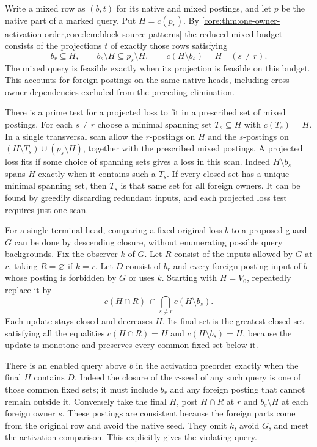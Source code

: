 Write a mixed row as $(b,t)$ for its native and mixed
postings, and let $p$ be the native part of a marked query.
Put $H=c(p_r)$. By
\cref{core:thm:one-owner-activation-order,core:lem:block-source-patterns}
the reduced mixed budget consists of the projections $t$
of exactly those rows satisfying
\[
 b_r\subseteq H,\qquad
 b_s\setminus H\subseteq p_s\setminus H,\qquad
 c(H\setminus b_s)=H \quad(s\ne r).
\]
The mixed query is feasible exactly when its projection
is feasible on this budget. This accounts for foreign
postings on the same native heads, including cross-owner
dependencies excluded from the preceding elimination.

There is a prime test for a projected loss to fit in a
prescribed set of mixed postings. For each $s\ne r$ choose
a minimal spanning set $T_s\subseteq H$ with $c(T_s)=H$.
In a single transversal scan allow the $r$-postings on
$H$ and the $s$-postings on
$(H\setminus T_s)\cup(p_s\setminus H)$, together with the
prescribed mixed postings. A projected loss fits if some
choice of spanning sets gives a loss in this scan. Indeed
$H\setminus b_s$ spans $H$ exactly when it contains such
a $T_s$. If every closed set has a unique minimal spanning
set, then $T_s$ is that same set for all foreign owners.
It can be found by greedily discarding redundant inputs,
and each projected loss test requires just one scan.

For a single terminal head, comparing a fixed original
loss $b$ to a proposed guard $G$ can be done by descending
closure, without enumerating possible query backgrounds.
Fix the observer $k$ of $G$. Let $R$ consist of the inputs
allowed by $G$ at $r$, taking $R=\varnothing$ if $k=r$.
Let $D$ consist of $b_r$ and every foreign posting input
of $b$ whose posting is forbidden by $G$ or uses $k$.
Starting with $H=V_0$, repeatedly replace it by
\[
           c(H\cap R)\ \cap\!
           \bigcap_{s\ne r} c(H\setminus b_s).
\]
Each update stays closed and decreases $H$. Its final
set is the greatest closed set satisfying all the
equalities $c(H\cap R)=H$ and $c(H\setminus b_s)=H$,
because the update is monotone and preserves every
common fixed set below it.

There is an enabled query above $b$ in the activation
preorder exactly when the final $H$ contains $D$.
Indeed the closure of the $r$-seed of any such query
is one of those common fixed sets; it must include
$b_r$ and any foreign posting that cannot remain
outside it. Conversely take the final $H$, post
$H\cap R$ at $r$ and $b_s\setminus H$ at each foreign
owner $s$. These postings are consistent because the
foreign parts come from the original row and avoid
the native seed. They omit $k$, avoid $G$, and meet
the activation comparison. This explicitly gives the
violating query.

